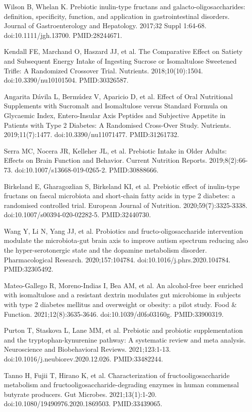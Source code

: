 \documentclass[11pt,oneside]{book}
\newcommand{\reff}[2]{\par\hangindent=7mm\hangafter=1\noindent[#1]\hspace{2mm}#2\par}
\begin{document}
\reff{11}{Wilson B, Whelan K. Prebiotic inulin-type fructans and galacto-oligosaccharides: definition, specificity, function, and application in gastrointestinal disorders. Journal of Gastroenterology and Hepatology. 2017;32 Suppl 1:64-68. doi:10.1111/jgh.13700. PMID:28244671.}
\reff{12}{Kendall FE, Marchand O, Haszard JJ, et al. The Comparative Effect on Satiety and Subsequent Energy Intake of Ingesting Sucrose or Isomaltulose Sweetened Trifle: A Randomized Crossover Trial. Nutrients. 2018;10(10):1504. doi:10.3390/nu10101504. PMID:30326587.}
\reff{13}{Angarita Dávila L, Bermúdez V, Aparicio D, et al. Effect of Oral Nutritional Supplements with Sucromalt and Isomaltulose versus Standard Formula on Glycaemic Index, Entero-Insular Axis Peptides and Subjective Appetite in Patients with Type 2 Diabetes: A Randomised Cross-Over Study. Nutrients. 2019;11(7):1477. doi:10.3390/nu11071477. PMID:31261732.}
\reff{14}{Serra MC, Nocera JR, Kelleher JL, et al. Prebiotic Intake in Older Adults: Effects on Brain Function and Behavior. Current Nutrition Reports. 2019;8(2):66-73. doi:10.1007/s13668-019-0265-2. PMID:30888666.}
\reff{15}{Birkeland E, Gharagozlian S, Birkeland KI, et al. Prebiotic effect of inulin-type fructans on faecal microbiota and short-chain fatty acids in type 2 diabetes: a randomised controlled trial. European Journal of Nutrition. 2020;59(7):3325-3338. doi:10.1007/s00394-020-02282-5. PMID:32440730.}
\reff{16}{Wang Y, Li N, Yang JJ, et al. Probiotics and fructo-oligosaccharide intervention modulate the microbiota-gut brain axis to improve autism spectrum reducing also the hyper-serotonergic state and the dopamine metabolism disorder. Pharmacological Research. 2020;157:104784. doi:10.1016/j.phrs.2020.104784. PMID:32305492.}
\reff{17}{Mateo-Gallego R, Moreno-Indias I, Bea AM, et al. An alcohol-free beer enriched with isomaltulose and a resistant dextrin modulates gut microbiome in subjects with type 2 diabetes mellitus and overweight or obesity: a pilot study. Food \& Function. 2021;12(8):3635-3646. doi:10.1039/d0fo03160g. PMID:33900319.}
\reff{18}{Purton T, Staskova L, Lane MM, et al. Prebiotic and probiotic supplementation and the tryptophan-kynurenine pathway: A systematic review and meta analysis. Neuroscience and Biobehavioral Reviews. 2021;123:1-13. doi:10.1016/j.neubiorev.2020.12.026. PMID:33482244.}
\reff{19}{Tanno H, Fujii T, Hirano K, et al. Characterization of fructooligosaccharide metabolism and fructooligosaccharide-degrading enzymes in human commensal butyrate producers. Gut Microbes. 2021;13(1):1-20. doi:10.1080/19490976.2020.1869503. PMID:33439065.}
\end{document}

